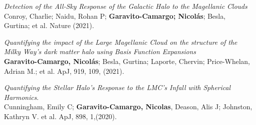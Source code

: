 \documentclass[UTF8]{article}
\begin{document}
\begin{etaremune}
\item \textit{Detection of the All-Sky Response of the Galactic
  Halo to the Magellanic Clouds}\\ 
  Conroy, Charlie; Naidu, Rohan P; \textbf{Garavito-Camargo; Nicol\'as}; Besla,
  Gurtina; et al. Nature (2021). 

\item \textit{Quantifying the impact of the Large Magellanic Cloud on the
  structure of the Milky Way’s dark matter halo using Basis Function Expansions}\\ 
  \textbf{Garavito-Camargo, Nicol\'as}; Besla, Gurtina; Laporte,
  Chervin; Price-Whelan, Adrian M.; et al. ApJ, 919, 109, (2021). 

\item \textit{Quantifying the Stellar Halo's Response to the LMC's Infall with
  Spherical Harmonics}.\\
  Cunningham, Emily C; \textbf{Garavito-Camargo, Nicolas}, Deason, Alis J;
  Johnston, Kathryn V. et al. ApJ, 898, 1,(2020).


\end{etaremune}
\end{document}
